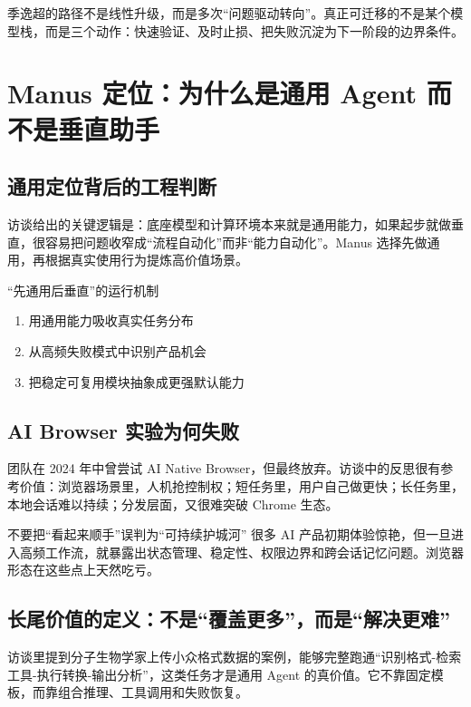 \documentclass[a4paper]{article}
\begin{document}
季逸超的路径不是线性升级，而是多次“问题驱动转向”。真正可迁移的不是某个模型栈，而是三个动作：快速验证、及时止损、把失败沉淀为下一阶段的边界条件。


\section{Manus 定位：为什么是通用 Agent 而不是垂直助手}

\subsection{通用定位背后的工程判断}

访谈给出的关键逻辑是：底座模型和计算环境本来就是通用能力，如果起步就做垂直，很容易把问题收窄成“流程自动化”而非“能力自动化”。Manus 选择先做通用，再根据真实使用行为提炼高价值场景。

\begin{knowledgebox}{“先通用后垂直”的运行机制}
\begin{enumerate}
    \item 用通用能力吸收真实任务分布
    \item 从高频失败模式中识别产品机会
    \item 把稳定可复用模块抽象成更强默认能力
\end{enumerate}
\end{knowledgebox}

\subsection{AI Browser 实验为何失败}

团队在 2024 年中曾尝试 AI Native Browser，但最终放弃。访谈中的反思很有参考价值：浏览器场景里，人机抢控制权；短任务里，用户自己做更快；长任务里，本地会话难以持续；分发层面，又很难突破 Chrome 生态。

\begin{warningbox}{不要把“看起来顺手”误判为“可持续护城河”}
很多 AI 产品初期体验惊艳，但一旦进入高频工作流，就暴露出状态管理、稳定性、权限边界和跨会话记忆问题。浏览器形态在这些点上天然吃亏。
\end{warningbox}

\subsection{长尾价值的定义：不是“覆盖更多”，而是“解决更难”}

访谈里提到分子生物学家上传小众格式数据的案例，能够完整跑通“识别格式-检索工具-执行转换-输出分析”，这类任务才是通用 Agent 的真价值。它不靠固定模板，而靠组合推理、工具调用和失败恢复。
\end{document}
